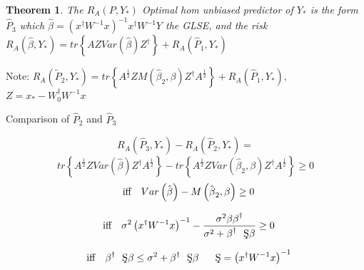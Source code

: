 \documentclass{article}
\newtheorem{theorem}{Theorem}
\begin{document}
\bigskip

\begin{theorem}
The $R_{A}\left( P,Y_{\ast }\right) $ Optimal hom unbiased predictor of $%
Y_{\ast }$ is the form $\hat{P}_{3}$ which $\hat{\beta}=\left( x^{\dagger
}W^{-1}x\right) ^{-1}x^{\dagger }W^{-1}Y$ the GLSE, and the risk $%
R_{A}\left( \hat{\beta},Y_{\ast }\right) =tr\left\{ AZVar\left( \hat{\beta}%
\right) Z^{\dagger }\right\} +R_{A}\left( \hat{P}_{1},Y_{\ast }\right) $
\end{theorem}

Note: $R_{A}\left( \tilde{P}_{2},Y_{\ast }\right) =tr\left\{ A^{\frac{1}{2}%
}ZM\left( \hat{\beta}_{2},\beta \right) Z^{\dagger }A^{\frac{1}{2}}\right\}
+R_{A}\left( \hat{P}_{1},Y_{\ast }\right) ,$ $Z=x_{\ast }-W_{0}^{\dagger
}W^{-1}x$

\bigskip

Comparison of $\hat{P}_{2}$ and $\hat{P}_{3}$

\begin{equation*}
R_{A}\left( \hat{P}_{3},Y_{\ast }\right) -R_{A}\left( \hat{P}_{2},Y_{\ast
}\right) =
\end{equation*}%
\begin{equation*}
tr\left\{ A^{\frac{1}{2}}ZVar\left( \hat{\beta}\right) Z^{\dagger }A^{\frac{1%
}{2}}\right\} -tr\left\{ A^{\frac{1}{2}}ZVar\left( \hat{\beta}_{2},\beta
\right) Z^{\dagger }A^{\frac{1}{2}}\right\} \geq 0
\end{equation*}%
\begin{equation*}
\text{iff\quad }Var\left( \hat{\beta}\right) -M\left( \hat{\beta}_{2},\beta
\right) \geq 0
\end{equation*}

\begin{equation*}
\text{iff\quad }\sigma ^{2}\left( x^{\dagger }W^{-1}x\right) ^{-1}-\frac{%
\sigma ^{2}\beta \beta ^{\dagger }}{\sigma ^{2}+\beta ^{\dagger }\text{\c{S}}%
\beta }\geq 0
\end{equation*}

\begin{equation*}
\text{iff\quad }\beta ^{\dagger }\text{\c{S}}\beta \leq \sigma ^{2}+\beta
^{\dagger }\text{\c{S}}\beta \quad \text{\c{S}}=\left( x^{\dagger
}W^{-1}x\right) ^{-1}
\end{equation*}

\bigskip
\end{document}
